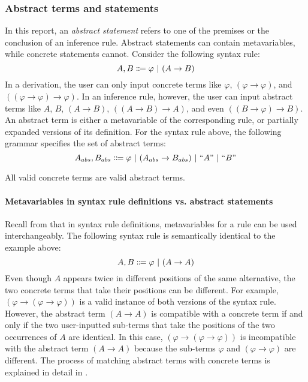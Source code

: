 \subsubsection{Abstract terms and statements}
In this report, an \textit{abstract statement} refers to one of the premises or the conclusion of an inference rule. Abstract statements can contain metavariables, while concrete statements cannot. Consider the following syntax rule:
\[
    A, B \Coloneqq \varphi \ |\  (A \to B)
\]
In a derivation, the user can only input concrete terms like $\varphi$, $(\varphi \to \varphi)$, and $((\varphi \to \varphi) \to \varphi)$. In an inference rule, however, the user can input abstract terms like $A$, $B$, $(A \to B)$, $((A \to B) \to A)$, and even $((B \to \varphi) \to B)$. An abstract term is either a metavariable of the corresponding rule, or partially expanded versions of its definition. For the syntax rule above, the following grammar specifies the set of abstract terms:
\[
    A_{abs}, B_{abs} \Coloneqq \varphi \ |\  (A_{abs} \to B_{abs}) \ |\  \text{``$A$''} \ |\  \text{``$B$''}
\]

All valid concrete terms are valid abstract terms.

\paragraph{Metavariables in syntax rule definitions vs. abstract statements}
Recall from  that in syntax rule definitions, metavariables for a rule can be used interchangeably. The following syntax rule is semantically identical to the example above:
\[
    A, B \Coloneqq \varphi \ |\  (A \to A)
\]
Even though $A$ appears twice in different positions of the same alternative, the two concrete terms that take their positions can be different. For example, $(\varphi \to (\varphi \to \varphi))$ is a valid instance of both versions of the syntax rule. However, the abstract term $(A \to A)$ is compatible with a concrete term if and only if the two user-inputted sub-terms that take the positions of the two occurrences of $A$ are identical. In this case, $(\varphi \to (\varphi \to \varphi))$ is incompatible with the abstract term $(A \to A)$ because the sub-terms $\varphi$ and $(\varphi \to \varphi)$ are different. The process of matching abstract terms with concrete terms is explained in detail in .

